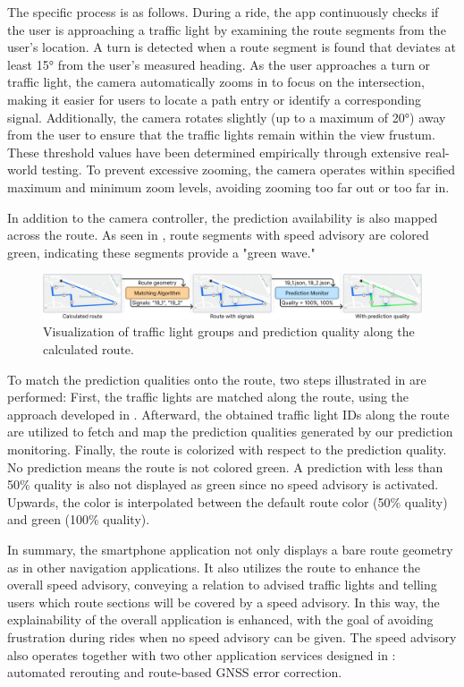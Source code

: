 The specific process is as follows. During a ride, the app continuously checks if the user is approaching a traffic light by examining the route segments from the user's location. A turn is detected when a route segment is found that deviates at least 15° from the user's measured heading. As the user approaches a turn or traffic light, the camera automatically zooms in to focus on the intersection, making it easier for users to locate a path entry or identify a corresponding signal. Additionally, the camera rotates slightly (up to a maximum of 20°) away from the user to ensure that the traffic lights remain within the view frustum. These threshold values have been determined empirically through extensive real-world testing. To prevent excessive zooming, the camera operates within specified maximum and minimum zoom levels, avoiding zooming too far out or too far in.

In addition to the camera controller, the prediction availability is also mapped across the route. As seen in , route segments with speed advisory are colored green, indicating these segments provide a "green wave." 

\begin{figure}[t]
\centering
\includegraphics[width=\linewidth]{images/routing-process-quality-mapping.png}
\caption{Visualization of traffic light groups and prediction quality along the calculated route.}
\label{fig:routing-process-quality-mapping}
\end{figure}

To match the prediction qualities onto the route, two steps illustrated in  are performed: First, the traffic lights are matched along the route, using the approach developed in . Afterward, the obtained traffic light IDs along the route are utilized to fetch and map the prediction qualities generated by our prediction monitoring. Finally, the route is colorized with respect to the prediction quality. No prediction means the route is not colored green. A prediction with less than 50\% quality is also not displayed as green since no speed advisory is activated. Upwards, the color is interpolated between the default route color (50\% quality) and green (100\% quality).

In summary, the smartphone application not only displays a bare route geometry as in other navigation applications. It also utilizes the route to enhance the overall speed advisory, conveying a relation to advised traffic lights and telling users which route sections will be covered by a speed advisory. In this way, the explainability of the overall application is enhanced, with the goal of avoiding frustration during rides when no speed advisory can be given. The speed advisory also operates together with two other application services designed in : automated rerouting and route-based GNSS error correction.


